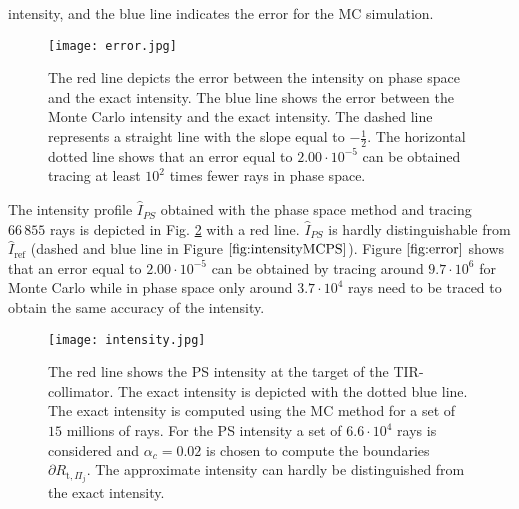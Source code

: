 intensity, and the blue line indicates the error for the MC simulation.
\begin{figure}[h!]
  \begin{center}
  \texttt{[image: error.jpg]}
  \end{center}
  \caption{\footnotesize{ The red line depicts the error between the intensity on phase space and the exact intensity.
 The blue line shows the error between the Monte Carlo intensity and the exact intensity.
  The dashed line represents a straight line with the slope equal to $-\frac{1}{2}$.
  The horizontal dotted line shows that an error equal to $2.00 \cdot  10^{-5}$ can be obtained tracing at least $10^2$ times fewer rays in phase space.}}
  \label{fig:error}
\end{figure}
\noindent The intensity profile $\hat{I}_{PS}
$ obtained with the phase space method and tracing $66\,855$ rays is depicted in Fig. \ref{fig:intensityMCPS} with a red line.
$\hat{I}_{PS}$ is hardly distinguishable from $\hat{I}_{\mbox{ref}}$ (dashed and blue line in Figure $\ref{fig:intensityMCPS}$).
Figure $\ref{fig:error}$ shows that an error equal to $2.00 \cdot  10^{-5}$ can be obtained by tracing around $9.7 \cdot 10^{6}$ for
Monte Carlo while in phase space only around $3.7 \cdot 10^4$ rays need  to be traced to obtain the same accuracy of the intensity.
  \begin{figure}[h]
    \centering
    \texttt{[image: intensity.jpg]}
\caption{\footnotesize{The red line shows the PS intensity at the target of the TIR-collimator. The exact intensity is depicted with the dotted blue line.
The exact intensity is computed using the MC method for a set of $15$ millions of rays. For the PS intensity a set of $6.6\cdot 10^4$
rays is considered and $\alpha_c = 0.02$ is chosen to compute the boundaries $\partial R_{\textrm{t}, \Pi_j}$. The approximate intensity can hardly be distinguished from the exact
intensity. }}
  \label{fig:intensityMCPS}
\end{figure}
 










































